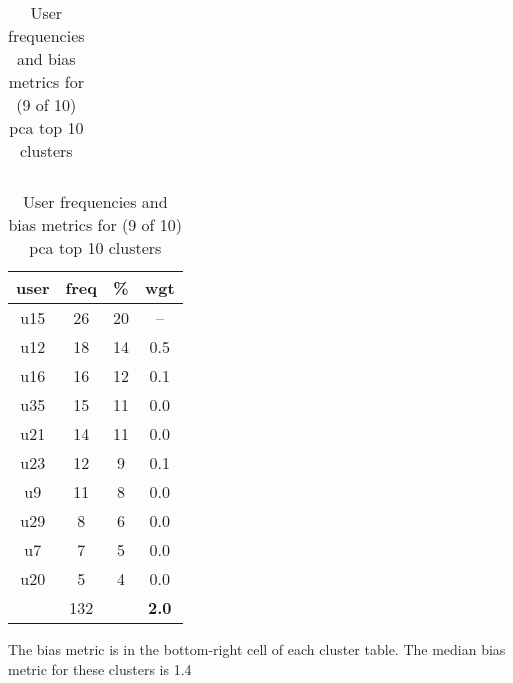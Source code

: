 \begin{appendices}
\begin{table}
\begin{tabular}{ |c|c|c|c| }
	\hline
\end{tabular}
\begin{tabular}{ |c|c|c|c| }
	\hline
	\textbf{user} & \textbf{freq} & \textbf{\%} & \textbf{wgt} \\
	\hline
	u15 & 26 & 20 & -- \\
	u12 & 18 & 14 & 0.5 \\
	u16 & 16 & 12 & 0.1 \\
	u35 & 15 & 11 & 0.0 \\
	u21 & 14 & 11 & 0.0 \\
	u23 & 12 & 9 & 0.1 \\
	u9 & 11 & 8 & 0.0 \\
	u29 & 8 & 6 & 0.0 \\
	u7 & 7 & 5 & 0.0 \\
	u20 & 5 & 4 & 0.0 \\
	 & 132 & & \textbf{2.0} \\
	\hline
\end{tabular}
\caption{User frequencies and bias metrics for (9 of 10) pca top 10 clusters}
{\small The bias metric is in the bottom-right cell of each cluster table. The median bias metric for these clusters is 1.4}
\end{table}


\end{appendices}

